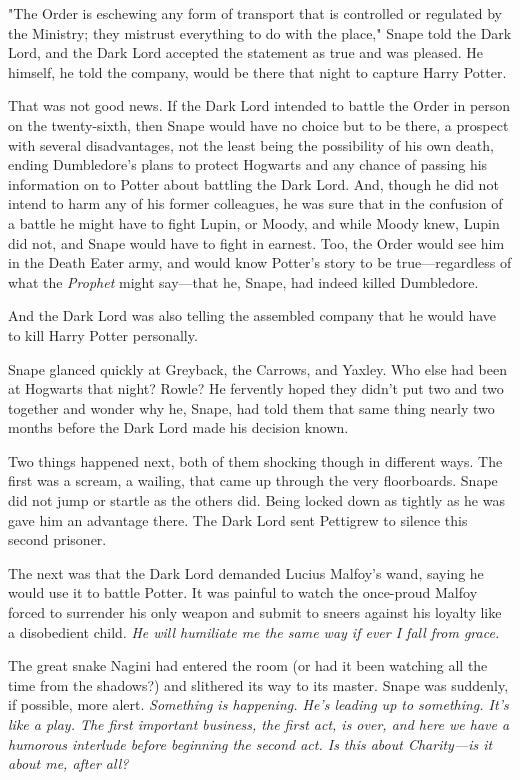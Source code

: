 "The Order is eschewing any form of transport that is controlled or regulated by the Ministry; they mistrust everything to do with the place," Snape told the Dark Lord, and the Dark Lord accepted the statement as true and was pleased. He himself, he told the company, would be there that night to capture Harry Potter.

That was not good news. If the Dark Lord intended to battle the Order in person on the twenty-sixth, then Snape would have no choice but to be there, a prospect with several disadvantages, not the least being the possibility of his own death, ending Dumbledore's plans to protect Hogwarts and any chance of passing his information on to Potter about battling the Dark Lord. And, though he did not intend to harm any of his former colleagues, he was sure that in the confusion of a battle he might have to fight Lupin, or Moody, and while Moody knew, Lupin did not, and Snape would have to fight in earnest. Too, the Order would see him in the Death Eater army, and would know Potter's story to be true—regardless of what the \emph{Prophet} might say—that he, Snape, had indeed killed Dumbledore.

And the Dark Lord was also telling the assembled company that he would have to kill Harry Potter personally.

Snape glanced quickly at Greyback, the Carrows, and Yaxley. Who else had been at Hogwarts that night? Rowle? He fervently hoped they didn't put two and two together and wonder why he, Snape, had told them that same thing nearly two months before the Dark Lord made his decision known.

Two things happened next, both of them shocking though in different ways. The first was a scream, a wailing, that came up through the very floorboards. Snape did not jump or startle as the others did. Being locked down as tightly as he was gave him an advantage there. The Dark Lord sent Pettigrew to silence this second prisoner.

The next was that the Dark Lord demanded Lucius Malfoy's wand, saying he would use it to battle Potter. It was painful to watch the once-proud Malfoy forced to surrender his only weapon and submit to sneers against his loyalty like a disobedient child. \emph{He will humiliate me the same way if ever I fall from grace.}

The great snake Nagini had entered the room (or had it been watching all the time from the shadows?) and slithered its way to its master. Snape was suddenly, if possible, more alert. \emph{Something is happening. He's leading up to something. It's like a play. The first important business, the first act, is over, and here we have a humorous interlude before beginning the second act. Is this about Charity—is it about me, after all?}

